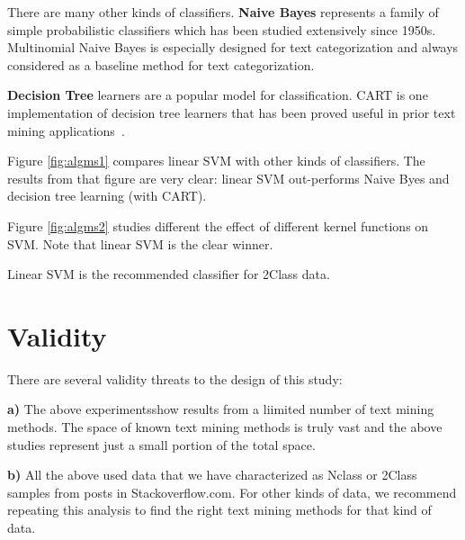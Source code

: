 \documentclass{sig-alternate-05-2015}
\theoremstyle{break}
\begin{document}
 There are many other kinds of classifiers.
\textbf{Naive Bayes} represents a family of simple probabilistic classifiers which has been studied extensively since 1950s. Multinomial Naive Bayes is especially designed for text categorization \cite{mccallum1998comparison} and always considered as a baseline method for text categorization. 

\textbf{Decision Tree} learners are  a popular model for classification. CART is one implementation of decision tree learners that has been proved useful in prior text mining applications~\cite{miotto2005supporting}.

 
Figure \ref{fig:algms1} compares linear SVM with other kinds
of classifiers. The results from that figure are very clear:
linear SVM out-performs Naive Byes and decision tree learning
(with CART).
 
Figure \ref{fig:algms2} studies different the effect of different
kernel functions on SVM. Note that linear SVM is the clear winner.
\begin{lesson}
Linear SVM is the recommended classifier for 2Class data.
\end{lesson}
 




\section{Validity}

There are several validity threats to the design of this study: 

\textbf{a)} The above experimentsshow results from a
liimited number of text mining methods.
The space of known text mining methods is truly vast
and the above studies represent just a small portion of the total space.

 
\textbf{b)} All the above used data that we have characterized as Nclass or 2Class samples
from posts in Stackoverflow.com. For other kinds of data, we recommend repeating this
analysis to find the right text mining methods for that kind of data.
\end{document}
